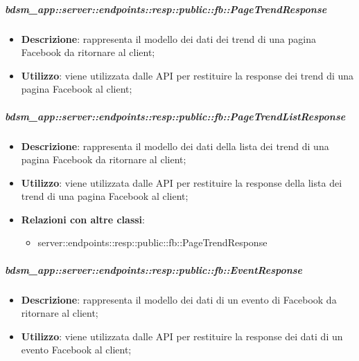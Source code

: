     \subparagraph{bdsm\_app::server::endpoints::resp::public::fb::PageTrendResponse} %
    \label{subp:bdsm_app_server_endpoints_resp_public_fb_pagetrendresponse}
    \begin{itemize}
      \item \textbf{Descrizione}: rappresenta il modello dei dati dei trend di una pagina Facebook da ritornare al client;
      \item \textbf{Utilizzo}: viene utilizzata dalle API per restituire la response dei trend di una pagina Facebook al client;
      \end{itemize}

    \subparagraph{bdsm\_app::server::endpoints::resp::public::fb::PageTrendListResponse} %
    \label{subp:bdsm_app_server_endpoints_resp_public_fb_pagetrendlistresponse}
    \begin{itemize}
      \item \textbf{Descrizione}: rappresenta il modello dei dati della lista dei trend di una pagina Facebook da ritornare al client;
      \item \textbf{Utilizzo}: viene utilizzata dalle API per restituire la response della lista dei trend di una pagina Facebook al client;
      \item \textbf{Relazioni con altre classi}:
        \begin{itemize}
          \item server::endpoints::resp::public::fb::PageTrendResponse
        \end{itemize}
      \end{itemize}

    \subparagraph{bdsm\_app::server::endpoints::resp::public::fb::EventResponse} %
    \label{subp:bdsm_app_server_endpoints_resp_public_fb_eventresponse}
    \begin{itemize}
      \item \textbf{Descrizione}: rappresenta il modello dei dati di un evento di Facebook da ritornare al client;
      \item \textbf{Utilizzo}: viene utilizzata dalle API per restituire la response dei dati di un evento Facebook al client;
      \end{itemize}

